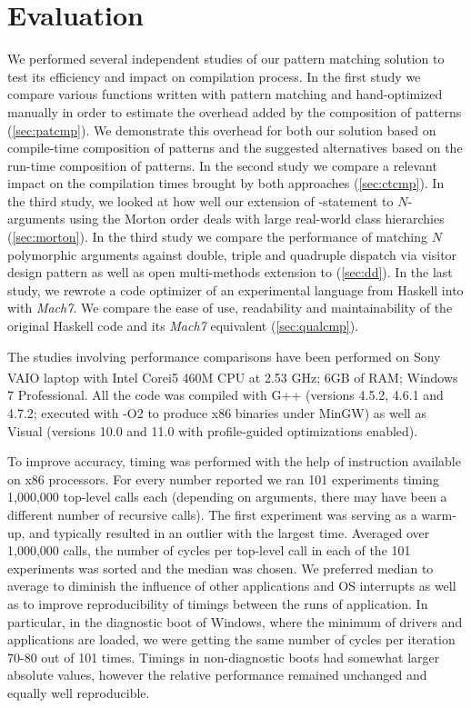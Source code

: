 \section{Evaluation} %
\label{sec:eval}

We performed several independent studies of our pattern matching solution to 
test its efficiency and impact on compilation process. In the first study we 
compare various functions written with pattern matching and hand-optimized 
manually in order to estimate the overhead added by the composition of patterns 
(\textsection\ref{sec:patcmp}). We demonstrate this overhead for both our 
solution based on compile-time composition of patterns and the suggested 
alternatives based on the run-time composition of patterns. In the second 
study we compare a relevant impact on the compilation times brought by both 
approaches (\textsection\ref{sec:ctcmp}). In the third study, we looked at how well our extension 
of -statement to $N$-arguments using the Morton order deals with 
large real-world class hierarchies (\textsection\ref{sec:morton}). In the third 
study we compare the performance of matching $N$ polymorphic arguments against 
double, triple and quadruple dispatch via visitor design pattern as well as 
open multi-methods extension to \Cpp{} (\textsection\ref{sec:dd}). 
In the last study, we rewrote a code 
optimizer of an experimental language from Haskell into \Cpp{} with 
\emph{Mach7}. We compare the ease of use, readability and maintainability 
of the original Haskell code and its \emph{Mach7} equivalent 
(\textsection\ref{sec:qualcmp}).

The studies involving performance comparisons have been performed on 
Sony VAIO\textsuperscript{\textregistered} laptop with 
Intel\textsuperscript{\textregistered} Core\texttrademark i5 460M CPU at 2.53 
GHz; 6GB of RAM; Windows 7 Professional. All the code was compiled with G++ 
(versions 4.5.2, 4.6.1 and 4.7.2; executed with -O2 to produce x86 binaries 
under MinGW) as well as Visual \Cpp{} (versions 10.0 and 11.0 with 
profile-guided optimizations enabled).
 
To improve accuracy, timing was performed with the help of  
instruction available on x86 processors. For every number reported we ran 
101 experiments timing 1,000,000 top-level calls each (depending on arguments, 
there may have been a different number of recursive calls). The first experiment 
was serving as a warm-up, and typically resulted in an outlier with the largest 
time. Averaged over 1,000,000 calls, the number of cycles per top-level call in 
each of the 101 experiments was sorted and the median was chosen. We preferred 
median to average to diminish the influence of other applications and OS 
interrupts as well as to improve reproducibility of timings between the runs of 
application. In particular, in the diagnostic boot of Windows, where the minimum 
of drivers and applications are loaded, we were getting the same number of 
cycles per iteration 70-80 out of 101 times. Timings in non-diagnostic boots had 
somewhat larger absolute values, however the relative performance remained 
unchanged and equally well reproducible.

